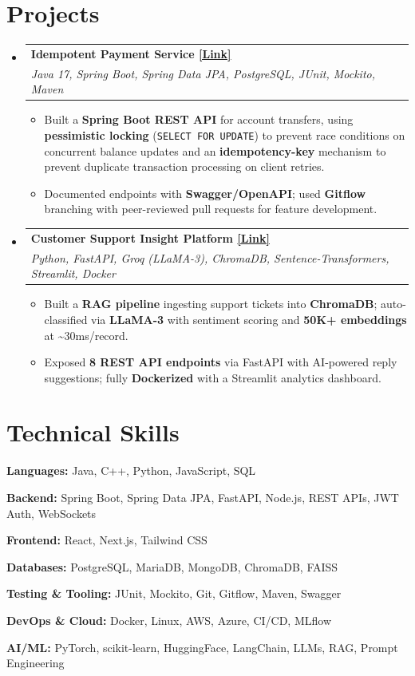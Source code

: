 \documentclass[letterpaper,11pt]{article}
\makeatletter
\newcommand{\resumeItem}[1]{
  \item \small{#1}
}
\newcommand{\resumeItemListStart}{
\begin{itemize}[leftmargin=*, itemsep=0pt, topsep=0pt, parsep=0pt, partopsep=0pt]
}
\newcommand{\resumeItemListEnd}{\end{itemize}\vspace{-5pt}}
\newcommand{\resumeSubheading}[4]{
\item
\begin{tabular*}{1.0\textwidth}{l@{\extracolsep{\fill}}r}
\textbf{#1} & \textbf{\small #2} \\
\textit{\small#3} & \textit{\small #4} \\
\end{tabular*}\vspace{-6pt}}
\newcommand{\resumeSubHeadingListStart}{\begin{itemize}[leftmargin=0in,label={}]}
\newcommand{\resumeSubHeadingListEnd}{\end{itemize}}
\makeatother
\begin{document}
\section{Projects}
\resumeSubHeadingListStart

\resumeSubheading
{Idempotent Payment Service \href{https://github.com/adityarana121/Idempotent-Payment-Service}{[Link]}}{}
{Java 17, Spring Boot, Spring Data JPA, PostgreSQL, JUnit, Mockito, Maven}{}
\resumeItemListStart
\resumeItem{Built a \textbf{Spring Boot REST API} for account transfers, using \textbf{pessimistic locking} (\texttt{SELECT FOR UPDATE}) to prevent race conditions on concurrent balance updates and an \textbf{idempotency-key} mechanism to prevent duplicate transaction processing on client retries.}
\resumeItem{Documented endpoints with \textbf{Swagger/OpenAPI}; used \textbf{Gitflow} branching with peer-reviewed pull requests for feature development.}
\resumeItemListEnd

\resumeSubheading
{Customer Support Insight Platform \href{https://github.com/adityarana121/Customer-insight-platform}{[Link]}}{}
{Python, FastAPI, Groq (LLaMA-3), ChromaDB, Sentence-Transformers, Streamlit, Docker}{}
\resumeItemListStart
\resumeItem{Built a \textbf{RAG pipeline} ingesting support tickets into \textbf{ChromaDB}; auto-classified via \textbf{LLaMA-3} with sentiment scoring and \textbf{50K+ embeddings} at \textasciitilde30ms/record.}
\resumeItem{Exposed \textbf{8 REST API endpoints} via FastAPI with AI-powered reply suggestions; fully \textbf{Dockerized} with a Streamlit analytics dashboard.}
\resumeItemListEnd

\resumeSubHeadingListEnd

\section{Technical Skills}
\begin{itemize}[leftmargin=0.15in, label={}, itemsep=1pt]
\small{
\item{\textbf{Languages:} Java, C++, Python, JavaScript, SQL}
\item{\textbf{Backend:} Spring Boot, Spring Data JPA, FastAPI, Node.js, REST APIs, JWT Auth, WebSockets}
\item{\textbf{Frontend:} React, Next.js, Tailwind CSS}
\item{\textbf{Databases:} PostgreSQL, MariaDB, MongoDB, ChromaDB, FAISS}
\item{\textbf{Testing \& Tooling:} JUnit, Mockito, Git, Gitflow, Maven, Swagger}
\item{\textbf{DevOps \& Cloud:} Docker, Linux, AWS, Azure, CI/CD, MLflow}
\item{\textbf{AI/ML:} PyTorch, scikit-learn, HuggingFace, LangChain, LLMs, RAG, Prompt Engineering}
}
\end{itemize}
\end{document}
